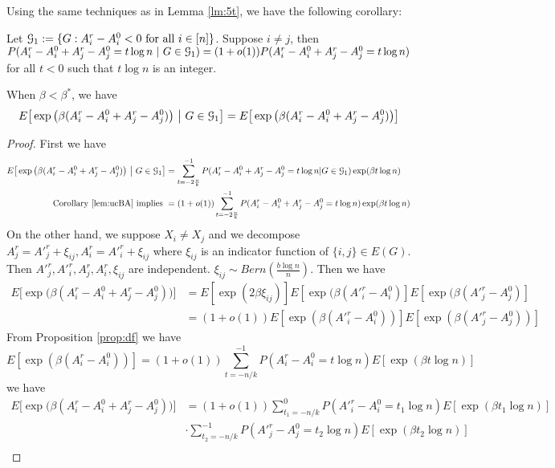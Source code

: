 \documentclass{article}
\begin{document}
Using the same techniques as in Lemma \ref{lm:5t}, we have the following corollary:
\begin{corollary}\label{lem:ucBA}
Let $\mathcal{G}_1:=\{G:A^r_i-A^0_i<0\text{~for all~}i\in[n]\}$. Suppose $i\neq j$, then $P(A^r_i-A^0_i + A^r_j - A^0_j= t\log n~|~G\in\mathcal{G}_1)= (1+o(1))P(A^r_i-A^0_i + A^r_j - A^0_j= t\log n)$ for all $t<0$ such that $t\log n$ is an integer.
\end{corollary}
\begin{lemma}\label{lem:BijG}
	When $\beta < \beta^*$, we have
\begin{align}
E \big[  \exp\big(\beta (A^r_i-A^0_i + A^r_j - A^0_j) \big) ~\big|~ G\in\mathcal{G}_1 \big] 
=E \big[  \exp\big(\beta (A^r_i-A^0_i + A^r_j - A^0_j) \big) \big] 
\end{align}
\end{lemma}
\begin{proof}
First we have
\begin{align}
E \big[  \exp\big(\beta (A^r_i - A^0_i + A^r_j - A^0_j) \big) ~\big|~ G\in\mathcal{G}_1 \big] 
&= \sum_{t=-2\frac{n}{k}}^{-1} P(A^r_i - A^0_i + A^r_j - A^0_j = t\log n | G \in \mathcal{G}_1) \exp(\beta t \log n) \notag \\
\text{ Corollary \ref{lem:ucBA} implies }&= (1+o(1))\sum_{t=-2\frac{n}{k}}^{-1} P(A^r_i - A^0_i + A^r_j - A^0_j = t\log n) \exp(\beta t \log n)
\end{align}
On the other hand, we suppose $X_i \neq X_j$ and we decompose $A^r_j = A'^r_j + \xi_{ij}, A^r_i = A'^r_i + \xi_{ij}$ where $\xi_{ij}$ is an indicator function of $\{i,j\} \in E(G)$. Then $A'^r_j, A'^r_i, A^r_j, A^r_i, \xi_{ij}$ are independent.
$\xi_{ij} \sim Bern(\frac{b\log n}{n})$.
Then we have
\begin{align*}
E \big[  \exp\big(\beta (A^r_i - A^0_i + A^r_j - A^0_j ) \big) \big] & = E[\exp(2\beta \xi_{ij})] E[\exp(\beta (A'^r_i - A^0_i)]
E[\exp(\beta (A'^r_j - A^0_j)] \\
& = (1+o(1))E[\exp(\beta(A'^r_i - A^0_i))] E[\exp(\beta(A'^r_j - A^0_j))]
\end{align*}
From Proposition \ref{prop:df} we have
$$
E[\exp(\beta(A^r_i - A^0_i))] = (1+o(1)) \sum_{t=-n/k}^{-1} P(A^r_i - A^0_i = t \log n)E[\exp(\beta t \log n)]
$$
we have
\begin{align*}
E \big[  \exp\big(\beta (A^r_i - A^0_i + A^r_j - A^0_j ) \big) \big] & = (1+o(1))
\sum_{t_1=-n/k}^{0} P(A'^r_i - A^0_i = t_1 \log n)E[\exp(\beta t_1 \log n)] \\
& \cdot
\sum_{t_2=-n/k}^{-1} P(A'^r_j - A^0_j = t_2 \log n)E[\exp(\beta t_2 \log n)] \\

\end{align*}
\end{proof}
\end{document}
